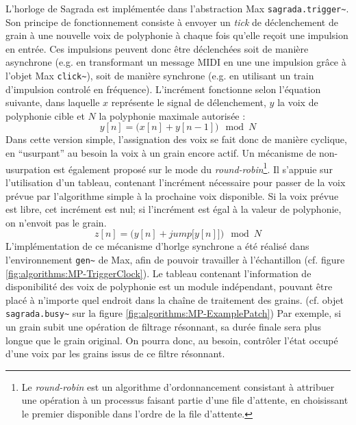 \noindent L'horloge de Sagrada est implémentée dans l'abstraction Max \verb|sagrada.trigger~|. Son principe de fonctionnement consiste à envoyer un \textit{tick} de déclenchement de grain à une nouvelle voix de polyphonie à chaque fois qu'elle reçoit une impulsion en entrée. Ces impulsions peuvent donc être déclenchées soit de manière asynchrone (e.g. en transformant un message \gls{MIDI} en une une impulsion grâce à l'objet Max \verb|click~|), soit de manière synchrone (e.g. en utilisant un train d'impulsion controlé en fréquence). L'incrément fonctionne selon l'équation suivante, dans laquelle $x$ représente le signal de délenchement, $y$ la voix de polyphonie cible et $N$ la polyphonie maximale autorisée :
$$ y[n] = \big(x[n] + y[n - 1]\big) \mod N $$
\noindent Dans cette version simple, l'assignation des voix se fait donc de manière cyclique, en ``usurpant'' au besoin la voix à un grain encore actif. Un mécanisme de non-usurpation est également proposé sur le mode du \textit{round-robin}\footnote{Le \textit{round-robin} est un algorithme d'ordonnancement consistant à attribuer une opération à un processus faisant partie d'une file d'attente, en choisissant le premier disponible dans l'ordre de la file d'attente.}. Il s'appuie sur l'utilisation d'un tableau, contenant l'incrément nécessaire pour passer de la voix prévue par l'algorithme simple à la prochaine voix disponible. Si la voix prévue est libre, cet incrément est nul; si l'incrément est égal à la valeur de polyphonie, on n'envoit pas le grain.
$$ z[n] = \Big(y[n] + jump\big[y[n]\big]\Big)\mod N $$
\noindent L'implémentation de ce mécanisme d'horlge synchrone a été réalisé dans l'environnement \verb|gen~| de Max, afin de pouvoir travailler à l'échantillon (cf. figure \ref{fig:algorithms:MP-TriggerClock}). Le tableau contenant l'information de disponibilité des voix de polyphonie est un module indépendant, pouvant être placé à n'importe quel endroit dans la chaîne de traitement des grains. (cf. objet \verb|sagrada.busy~| sur la figure \ref{fig:algorithms:MP-ExamplePatch}) Par exemple, si un grain subit une opération de filtrage résonnant, sa durée finale sera plus longue que le grain original. On pourra donc, au besoin, contrôler l'état occupé d'une voix par les grains issus de ce filtre résonnant.

